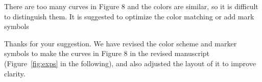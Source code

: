 \begin{revcomment}
	There are too many curves in Figure 8 and the colors are similar, so it is difficult to distinguish them. It is suggested to optimize the color matching or add mark symbols
\end{revcomment}
\begin{revresponse}
	Thanks for your suggestion.
	We have revised the color scheme and marker symbols to make the curves in Figure 8 in the revised manuscript (Figure~\ref{fig:exps} in the following), and also adjusted the layout of it to improve clarity.
	\begin{figure}[h]
		\setcounter{subfigure}{0}
		\hfill
		\hfill
		\hfill
\end{figure}
\end{revresponse}
